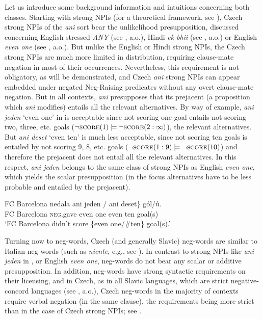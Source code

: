 \documentclass[output=paper,colorlinks,citecolor=brown]{langscibook}
\begin{document}
Let us introduce some background information and intuitions concerning both classes. Starting with strong NPIs (for a theoretical framework, see \cite{gajewski2011licensing}), Czech strong NPIs of the \textit{ani} sort bear the unlikelihood presupposition, discussed concerning English stressed  \emph{ANY} (see \citealt{krifka1995semantics}, a.o.), Hindi \emph{ek bhii} (see \citealt{lahiri1998focus}, a.o.) or English \emph{even one} (see \citealt{crnivc2014non}, a.o.). But unlike the English or Hindi strong NPIs, the Czech strong NPIs are much more limited in distribution, requiring clause-mate negation in most of their occurrences. Nevertheless, this requirement is not obligatory, as will be demonstrated, and Czech \textit{ani} strong NPIs can appear embedded under negated Neg-Raising predicates without any overt clause-mate negation. But in all contexts, \textit{ani} presupposes that its prejacent (a proposition which \textit{ani} modifies) entails all the relevant alternatives. By way of example, \textit{ani jeden} `even one' in  is acceptable since not scoring one goal entails not scoring two, three, etc. goals ($\neg \textsc{score}(1) \models \neg \textsc{score}(2:\infty)$), the relevant alternatives. But \textit{ani deset} `even ten' is much less acceptable, since not scoring ten goals is entailed by not scoring 9, 8, etc. goals ($\neg \textsc{score}(1:9) \models \neg \textsc{score}(10)$) and therefore the prejacent does not entail all the relevant alternatives. In this respect, \textit{ani jeden} belongs to the same class of strong NPIs as English \textit{even one}, which yields the scalar presupposition (in  the focus alternatives have to be less probable and entailed by the prejacent).
  
\ea\label{ex-2}\gll FC Barcelona nedala \minsp{\{} ani jeden / \minsp{\#} ani deset\} gól/ů.\\
FC Barcelona \textsc{neg}.gave {} even one {} {} even ten goal(s)\\
\glt `FC Barcelona didn't score \{even one/\#ten\} goal(s).'
\z

\noindent Turning now to neg-words, Czech (and generally Slavic) neg-words are similar to Italian neg-words (such as \emph{niente}, e.g., see \citealt{ladusaw1992expressing}). In contrast to strong NPIs like \textit{ani jeden} in , or English \textit{even one}, neg-words do not bear any scalar or additive presupposition. In addition, neg-words have strong syntactic requirements on their licensing, and in Czech, as in all Slavic languages, which are strict negative-concord languages (see \citealt{zeijlstra2004sentential}, a.o.), Czech neg-words in the majority of contexts require verbal negation (in the same clause), the requirements being more strict than in the case of Czech strong NPIs; see . 
\end{document}
